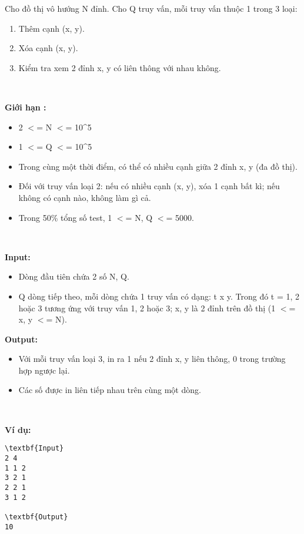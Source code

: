 

Cho đồ thị vô hướng N đỉnh. Cho Q truy vấn, mỗi truy vấn thuộc 1 trong 3 loại:
\begin{enumerate}
	\item Thêm cạnh (x, y).
	\item Xóa cạnh (x, y).
	\item Kiểm tra xem 2 đỉnh x, y có liên thông với nhau không.
\end{enumerate}

 

\textbf{Giới hạn : }
\begin{itemize}
	\item 2 $<$= N $<$= 10\textasciicircum5
	\item 1 $<$= Q $<$= 10\textasciicircum5
	\item Trong cùng một thời điểm, có thể có nhiều cạnh giữa 2 đỉnh x, y (đa đồ thị).
	\item Đối với truy vấn loại 2: nếu có nhiều cạnh (x, y), xóa 1 cạnh bất kì; nếu không có cạnh nào, không làm gì cả.
	\item Trong 50\% tổng số test, 1 $<$= N, Q $<$= 5000.
\end{itemize}

 

\textbf{Input: }
\begin{itemize}
	\item Dòng đầu tiên chứa 2 số N, Q.
	\item Q dòng tiếp theo, mỗi dòng chứa 1 truy vấn có dạng: t x y. Trong đó t = 1, 2 hoặc 3 tương ứng với truy vấn 1, 2 hoặc 3; x, y là 2 đỉnh trên đồ thị (1 $<$= x, y $<$= N).
\end{itemize}

\textbf{Output: }
\begin{itemize}
	\item Với mỗi truy vấn loại 3, in ra 1 nếu 2 đỉnh x, y liên thông, 0 trong trường hợp ngược lại.
	\item Các số được in liên tiếp nhau trên cùng một dòng.
\end{itemize}

 

\textbf{Ví dụ: }
\begin{verbatim}
\textbf{Input}
2 4
1 1 2
3 2 1
2 2 1
3 1 2

\textbf{Output}
10


\end{verbatim}